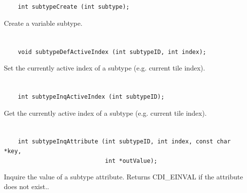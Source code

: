 \section*{\tt {}}

\begin{verbatim}
    int subtypeCreate (int subtype);
\end{verbatim}

Create a variable subtype.


\section*{\tt {}}

\begin{verbatim}
    void subtypeDefActiveIndex (int subtypeID, int index);
\end{verbatim}

Set the currently active index of a subtype (e.g. current tile index).


\section*{\tt {}}

\begin{verbatim}
    int subtypeInqActiveIndex (int subtypeID);
\end{verbatim}

Get the currently active index of a subtype (e.g. current tile index).


\section*{\tt {}}

\begin{verbatim}
    int subtypeInqAttribute (int subtypeID, int index, const char *key,
                             int *outValue);
\end{verbatim}

Inquire the value of a subtype attribute. Returns CDI_EINVAL if the attribute does not exist..


\section*{\tt {}}

